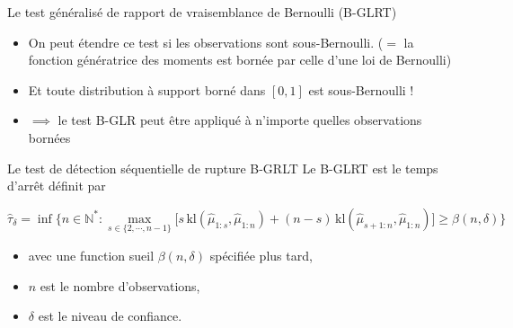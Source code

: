 \documentclass[11pt,french,ignorenonframetext,]{beamer}
\providecommand{\tightlist}{%
  \setlength{\itemsep}{0pt}\setlength{\parskip}{0pt}}
\begin{document}
\begin{frame}{Le test généralisé de rapport de vraisemblance de Bernoulli (B-GLRT)}

  \begin{itemize}
    \item
    On peut étendre ce test si les observations sont \alert{sous-Bernoulli}.
    ($=$ la fonction génératrice des moments est bornée par celle d'une loi de Bernoulli)
    \item
    Et toute distribution à support borné dans $[0,1]$ est sous-Bernoulli !
    \item
    $\implies$ le test B-GLR peut être appliqué à n'importe quelles observations bornées \dCooley{}
  \end{itemize}


  \pause

  \begin{block}{Le test de détection séquentielle de rupture B-GRLT}
    Le \alert{B-GLRT} est le temps d'arrêt définit par
    \begin{small}
    \[ \widehat{\tau}_{\delta} = \inf \bigl\{ n \in \mathbb{N}^* : \max_{s \in \{2,\cdots,n-1\}} \bigl[s \, \mathrm{kl}\left(\widehat{\mu}_{1:s},\widehat{\mu}_{1:n}\right) + (n-s) \, \mathrm{kl}\left(\widehat{\mu}_{s+1:n},\widehat{\mu}_{1:n}\right)\bigr] \geq \beta(n,\delta) \bigr\} \]
    \vspace*{-10pt}
    \end{small}%
    \begin{itemize}\tightlist
      \item avec une \alert{function sueil} $\beta(n,\delta)$ spécifiée plus tard,
      \item $n$ est le nombre d'observations,
      \item $\delta$ est le niveau de confiance.
    \end{itemize}%
  \end{block}

\end{frame}
\end{document}
